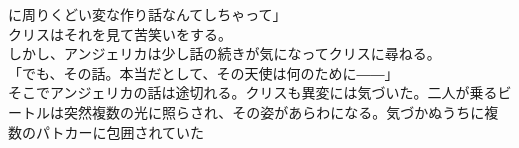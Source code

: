 \documentclass[b5j,10pt,openany]{jsbook}
\begin{document}
に周りくどい変な作り話なんてしちゃって」\\クリスはそれを見て苦笑いをする。\\しかし、アンジェリカは少し話の続きが気になってクリスに尋ねる。\\「でも、その話。本当だとして、その天使は何のために――」\\そこでアンジェリカの話は途切れる。クリスも異変には気づいた。二人が乗るビートルは突然複数の光に照らされ、その姿があらわになる。気づかぬうちに複数のパトカーに包囲されていた
\end{document}
